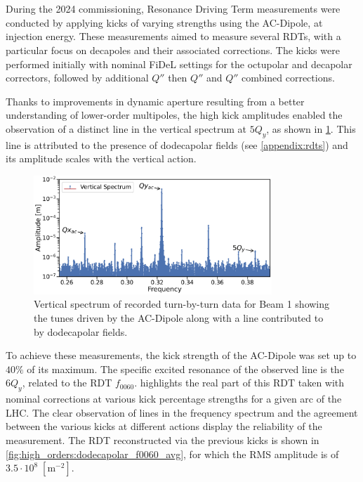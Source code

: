 \section{}


During the 2024 commissioning, Resonance Driving Term measurements were conducted by applying
kicks of varying strengths using the AC-Dipole, at injection energy. These measurements aimed to
measure several RDTs, with a particular focus on decapoles and their associated corrections. The
kicks were performed initially with nominal FiDeL settings for the octupolar and decapolar
correctors, followed by additional $Q''$ then $Q''$ and $Q''$ combined corrections.

Thanks to improvements in dynamic aperture resulting from a better understanding of lower-order
multipoles, the high kick amplitudes enabled the observation of a distinct line in the vertical
spectrum at $5Q_y$, as shown in \cref{fig:high_orders:spectrum_dodecapole_5qy}. This line is
attributed to the presence of dodecapolar fields (see \cref{appendix:rdts}) and its amplitude scales
with the vertical action.

\begin{figure}[!htb]
    \centering
    \includegraphics[width=0.8\textwidth]{./images/spectrum_dodecapole_5qy.pdf}
    \caption{Vertical spectrum of recorded turn-by-turn data for Beam 1 showing the tunes driven by
    the AC-Dipole along with a line contributed to by dodecapolar fields.}
    \label{fig:high_orders:spectrum_dodecapole_5qy}
\end{figure}

To achieve these measurements, the kick strength of the AC-Dipole was set up to $40\%$ of its
maximum. The specific excited resonance of the observed line is the $6Q_y$, related to the RDT
$f_{0060}$.
 highlights the real part of this RDT taken with nominal
corrections at various kick percentage strengths for a given arc of the LHC.
The clear observation of lines in the frequency spectrum and the agreement between the various
kicks at different actions display the reliability of the measurement.
The RDT reconstructed via the previous kicks is shown in
\cref{fig:high_orders:dodecapolar_f0060_avg}, for which the RMS amplitude is of
$3.5\cdot10^8\;[\text{m}^{-2}]$.

